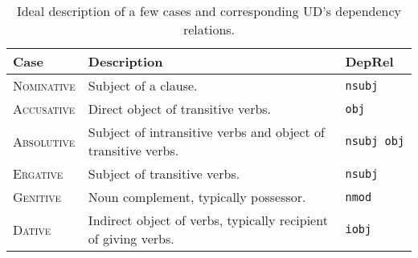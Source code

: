 \begin{table}
\centering
\begin{NiceTabular}{p{.24\columnwidth}p{.44\columnwidth}p{.15\columnwidth}}
    \toprule
    Case & Description & DepRel\\
    \midrule
    \textsc{Nominative} & Subject of a clause. & \tt nsubj \\
    \midrule
    \textsc{Accusative} & Direct object of transitive verbs. & \tt obj \\
    \midrule
    \textsc{Absolutive} & Subject of intransitive verbs and object of transitive verbs. & \tt nsubj \newline obj \\
    \midrule
    \textsc{Ergative} & Subject of transitive verbs. & \tt nsubj \\
    \midrule
    \textsc{Genitive} & Noun complement, typically possessor. & \tt nmod \\
    \midrule
    \textsc{Dative} & Indirect object of verbs, typically recipient of giving verbs. & \tt iobj \\
    \bottomrule
\end{NiceTabular}
    \caption{Ideal description of a few cases and corresponding UD's dependency relations.}
    \label{table:desc_case}
\end{table}